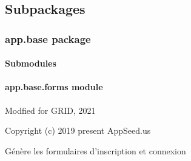 \documentclass[letterpaper,10pt,french]{sphinxmanual}
\begin{document}
\subsection{Subpackages}
\label{\detokenize{app:subpackages}}

\subsubsection{app.base package}
\label{\detokenize{app.base:app-base-package}}\label{\detokenize{app.base::doc}}

\paragraph{Submodules}
\label{\detokenize{app.base:submodules}}

\paragraph{app.base.forms module}
\label{\detokenize{app.base:module-app.base.forms}}\label{\detokenize{app.base:app-base-forms-module}}
\sphinxAtStartPar
Modfied for GRID, 2021

\sphinxAtStartPar
Copyright (c) 2019 \sphinxhyphen{} present AppSeed.us

\sphinxAtStartPar
Génère les formulaires d’inscription et connexion
\end{document}
